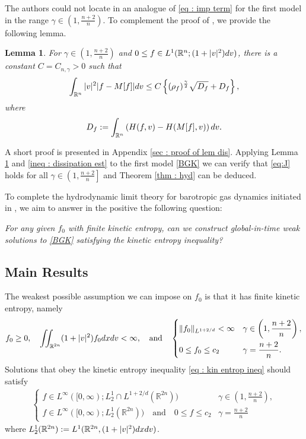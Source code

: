\documentclass{amsart}
\theoremstyle{plain}
\newtheorem{lemma}[theorem]{Lemma}
\theoremstyle{remark}
\numberwithin{equation}{section}
\newcommand{\R}{\mathbb{R}}
\newcommand{\dx}{\textnormal{d}x}
\newcommand{\dv}{\textnormal{d}v}
\newcommand{\lt}{\left}
\newcommand{\rt}{\right}
\newcommand{\intr}{\int_{\R^n}}
\begin{document}
The authors could not locate in \cite{berthelinvasseur2005} an analogue of \eqref{eq : imp term} for the first model in the range $\gamma\in \left(1,\frac{n+2}{n}\right)$. To complement the proof of \cite[Theorem 1.1]{berthelinvasseur2005}, we provide the following lemma.


\begin{lemma}
\label{lem:dis}
For $\gamma \in \lt(1,\frac{n+2}{n}\rt)$ and $0 \le f\in L^1(\R^n;(1+|v|^2)\dv)$, there is a constant $C=C_{n,\gamma}>0$ such that
\[
\intr |v|^2 |f-M[f]| \dv \le C \lt\{(\rho_{f})^{\frac{\gamma}{2}}\sqrt{D_f} + D_f \rt\},
\]
where
\[
D_f := \intr \lt(H(f,v) - H(M[f],v)\rt)\dv.
\]
\end{lemma}
A short proof is presented in Appendix \ref{sec : proof of lem dis}. Applying Lemma \ref{lem:dis} and \eqref{ineq : dissipation est} to the first model \eqref{BGK} we can verify that \eqref{eq:J} holds for all $\gamma \in \left(1,\frac{n+2}{n}\right]$ and Theorem \ref{thm : hyd} can be deduced.

To complete the hydrodynamic limit theory for barotropic gas dynamics initiated in \cite{berthelinvasseur2005}, we aim to answer in the positive the following question:

\vspace{.1cm}
\begin{center}
\emph{For any given $f_0$ with finite kinetic entropy, can we construct global-in-time weak solutions to \eqref{BGK} satisfying the kinetic entropy inequality?}
\end{center}

\subsection{Main Results}
The weakest possible assumption we can impose on $f_0$ is that it has finite kinetic entropy, namely
\begin{equation}
    \label{eq : init data f0 cond}
    f_0 \ge 0, \quad \iint_{\R^{2n}} (1+|v|^2) f_0  \dx\dv < \infty, \quad \text{and} \quad 
      \begin{cases}
      \|f_0\|_{L^{1+2/d}} <\infty &\displaystyle\gamma \in \lt(1, \frac{n+2}{n}\rt), \\[9pt]
      0\le f_0\le c_2 &\displaystyle \gamma = \frac{n+2}{n}.
      \end{cases}
\end{equation}
Solutions that obey the kinetic entropy inequality \eqref{eq : kin entrop ineq} should satisfy 
\begin{align}
\label{eq : f prop}
        \begin{cases}
            f \in L^\infty([0,\infty);L^1_2 \cap L^{1+2/d} (\R^{2n})) &\displaystyle \gamma \in \left(1,\frac{n+2}{n}\right),\\[9pt]
            f\in L^\infty([0,\infty);L^1_2(\R^{2n})) \quad\text{and} \quad 0 \le f \le c_2 &\displaystyle \gamma = \frac{n+2}{n}
        \end{cases}
\end{align}
where $L^1_2(\R^{2n}) := L^1(\R^{2n}, (1+|v|^2)\dx\dv)$.
\end{document}
